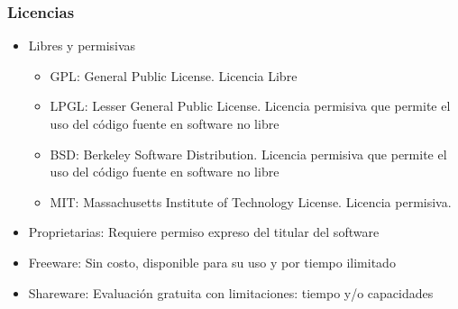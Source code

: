 \begin{frame}
  \frametitle{Licencias}
  \begin{itemize}
    \item Libres y permisivas
    \begin{itemize}
      \item \alert{GPL}: General Public License. Licencia Libre
      \item \alert{LPGL}: Lesser General Public License. Licencia permisiva que permite el uso del código fuente en software no libre
      \item \alert{BSD}: Berkeley Software Distribution. Licencia permisiva que permite el uso del código fuente en software no libre
      \item \alert{MIT}: Massachusetts Institute of Technology License. Licencia permisiva.
    \end{itemize}
    \item \alert{Proprietarias}: Requiere permiso expreso del titular del software
    \item \alert{Freeware}: Sin costo, disponible para su uso y por tiempo ilimitado
    \item \alert{Shareware}: Evaluación gratuita con limitaciones: tiempo y/o capacidades
  \end{itemize}
\end{frame}
